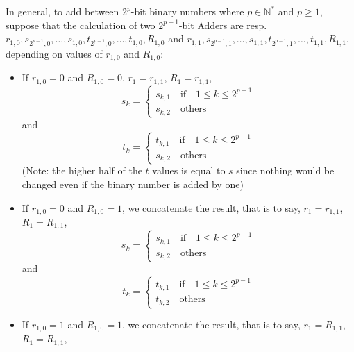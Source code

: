 \documentclass[conference]{IEEEtran}
\begin{document}
In general, to add between $2^p$-bit binary numbers where $p \in \mathbb{N}^*$ and $p \geq 1$, suppose that the calculation of two $2^{p-1}$-bit Adders are resp. $r_{1,0}, s_{2^{p-1},0}, \dots, s_{1,0}, t_{2^{p-1},0}, \dots, t_{1,0}, R_{1,0}$ and $r_{1,1}, s_{2^{p-1},1}, \dots, s_{1,1}, t_{2^{p-1},1}, \dots, t_{1,1}, R_{1,1}$, depending on values of $r_{1,0}$ and $R_{1,0}$:
\begin{itemize}
    \item If $r_{1,0}=0$ and $R_{1,0}=0$, $r_1 = r_{1,1}$, $R_1 = r_{1,1}$,
    \begin{equation}
        s_k = \begin{cases}
            s_{k,1} \quad \text{if} \quad 1 \leq k \leq 2^{p-1} \\
            s_{k,2} \quad \text{others}
        \end{cases}
    \end{equation}
    and
    \begin{equation}
        t_k = \begin{cases}
            t_{k,1} \quad \text{if} \quad 1 \leq k \leq 2^{p-1} \\
            s_{k,2} \quad \text{others}
        \end{cases}
    \end{equation}
    (Note: the higher half of the $t$ values is equal to $s$ since nothing would be changed even if the binary number is added by one)
    \item If $r_{1,0}=0$ and $R_{1,0}=1$, we concatenate the result, that is to say, $r_1 = r_{1,1}$, $R_1 = R_{1,1}$,
    \begin{equation}
        s_k = \begin{cases}
            s_{k,1} \quad \text{if} \quad 1 \leq k \leq 2^{p-1} \\
            s_{k,2} \quad \text{others}
        \end{cases}
    \end{equation}
    and
    \begin{equation}
        t_k = \begin{cases}
            t_{k,1} \quad \text{if} \quad 1 \leq k \leq 2^{p-1} \\
            t_{k,2} \quad \text{others}
        \end{cases}
    \end{equation} 
    \item If $r_{1,0}=1$ and $R_{1,0}=1$, we concatenate the result, that is to say, $r_1 = R_{1,1}$, $R_1 = R_{1,1}$,
    \begin{equation}

\end{equation}
\end{itemize}
\end{document}
